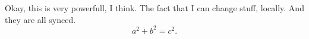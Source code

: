 Okay, this is very powerfull, I think.
The fact that I can change stuff, locally.
And they are all synced.
\[
    a^2+b^2=c^2.
\]